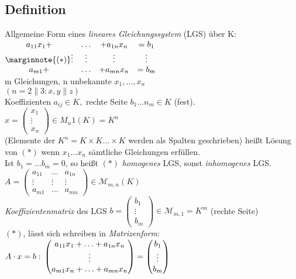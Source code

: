 \subsection{Definition}\label{sec:9.6}
Allgemeine Form eines \emph{lineares Gleichungssystem} (LGS) über K:\\
$\begin{matrix}
a_{11}x_1 +& \ldots &+ a_{1n}x_n& = b_1\\
\marginnote{(*)}\vdots&\vdots & \vdots &\vdots\\
a_{m1} +& \ldots &+  a_{mn}x_n &= b_m
\end{matrix}$\\
m Gleichungen, n unbekannte $x_1,\ldots,x_n$\\
$(n = 2\|3 : x,y\|z)$\\
Koeffizienten $a_{ij} \in K,$ rechte Seite $b_1 \ldots n_m \in K$ (fest).\\
$x = \begin{pmatrix}
x_1\\
\vdots\\
x_n
\end{pmatrix}
\in M_n1(K) = K^n$\\
(Elemente der $K^n = K \times K \ldots \times K$ werden als Spalten geschrieben) hei\ss t Lösung von $(*)$ wenn $x_1\ldots x_n$ sämtliche Gleichungen erfüllen.\\
Ist $b_1 = \ldots b_m = 0$, so hei\ss t $(*)$ \emph{homogenes} LGS, sonst \emph{inhomogenes} LGS.\\
$A = \begin{pmatrix}
a_11 &\ldots& a_{1n}\\
\vdots&\vdots&\vdots\\
a_{m1}&\ldots& a_{mn}
\end{pmatrix} \in \mathcal{M}_{m,n}(K)$\\
{\em Koeffizientenmatrix} des LGS $b=\begin{pmatrix}
b_1\\
\vdots\\
b_m
\end{pmatrix} \in \mathcal{M}_{m,1} = K^m$ \hfill (rechte Seite)\\
$(*)$, lässt sich schreiben in \emph{Matrizenform}:
$A \cdot x = b:\\
\begin{pmatrix}
a_{11}x_1 + \ldots + a_{1n}x_n\\
\vdots\\
a_{m1}x_n + \ldots + a_{mn}x_n
\end{pmatrix} = \begin{pmatrix}
b_1\\
\vdots\\
b_m
\end{pmatrix}$\\

